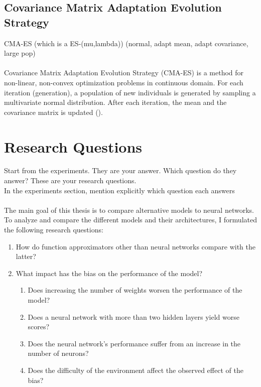

\subsection{Covariance Matrix Adaptation Evolution Strategy}
CMA-ES (which is a ES-(mu,lambda)) (normal, adapt mean, adapt covariance, large pop) \\ \\
Covariance Matrix Adaptation Evolution Strategy (CMA-ES) is a method for non-linear, non-convex optimization problems in continuous domain. For each iteration (generation), a population of new individuals is generated by sampling a multivariate normal distribution. After each iteration, the mean and the covariance matrix is updated (\cite{hansen2016cma}).


\section{Research Questions}
\label{sec:research_questions}
Start from the experiments. They are your answer. Which question do they answer? These are your research questions. \\
In the experiments section, mention explicitly which question each answers \\ \\
The main goal of this thesis is to compare alternative models to neural networks. To analyze and compare the different models and their architectures, I formulated the following research questions:
\begin{enumerate}
  \item How do function approximators other than neural networks compare with the latter?
  \item What impact has the bias on the performance of the model?
  \begin{enumerate}
    \item Does increasing the number of weights worsen the performance of the model?
    \item Does a neural network with more than two hidden layers yield worse scores?
    \item Does the neural network's performance suffer from an increase in the number of neurons?
    \item Does the difficulty of the environment affect the observed effect of the bias?
  \end{enumerate}
\end{enumerate}


